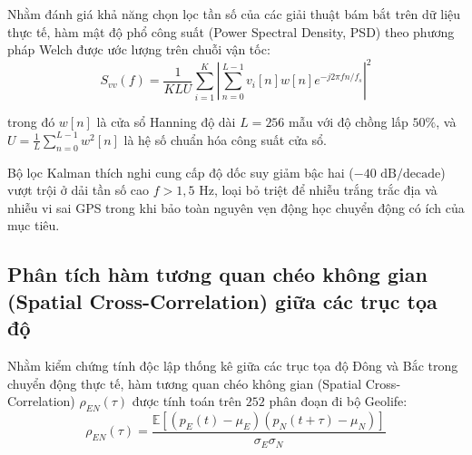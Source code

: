 \hspace{0.5cm} Nhằm đánh giá khả năng chọn lọc tần số của các giải thuật bám bắt trên dữ liệu thực tế, hàm mật độ phổ công suất (Power Spectral Density, PSD) theo phương pháp Welch được ước lượng trên chuỗi vận tốc:
\begin{equation}
S_{vv}(f) = \frac{1}{K L U} \sum_{i=1}^K \left| \sum_{n=0}^{L-1} v_i[n] w[n] e^{-j 2\pi f n / f_s} \right|^2
\label{eq:welch-psd-formula}
\end{equation}

trong đó $w[n]$ là cửa sổ Hanning độ dài $L = 256$ mẫu với độ chồng lấp $50\%$, và $U = \frac{1}{L} \sum_{n=0}^{L-1} w^2[n]$ là hệ số chuẩn hóa công suất cửa sổ.

\begin{table}[H]
\centering
\caption{Đặc tính tần số cắt $-3\text{ dB}$ và tỷ số tín hiệu trên nhiễu (SNR) trên dữ liệu thực}
\label{tab:spectral-characteristics-table}
\end{table}

Bộ lọc Kalman thích nghi cung cấp độ dốc suy giảm bậc hai ($-40\text{ dB/decade}$) vượt trội ở dải tần số cao $f > 1{,}5\text{ Hz}$, loại bỏ triệt để nhiễu trắng trắc địa và nhiễu vi sai GPS trong khi bảo toàn nguyên vẹn động học chuyển động có ích của mục tiêu.

\subsection{Phân tích hàm tương quan chéo không gian (Spatial Cross-Correlation) giữa các trục tọa độ}

\hspace{0.5cm} Nhằm kiểm chứng tính độc lập thống kê giữa các trục tọa độ Đông và Bắc trong chuyển động thực tế, hàm tương quan chéo không gian (Spatial Cross-Correlation) $\rho_{EN}(\tau)$ được tính toán trên $252$ phân đoạn đi bộ Geolife:
\begin{equation}
\rho_{EN}(\tau) = \frac{\mathbb{E}\left[ (p_E(t) - \mu_E)(p_N(t + \tau) - \mu_N) \right]}{\sigma_E \sigma_N}
\label{eq:spatial-cross-correlation-formula}
\end{equation}

